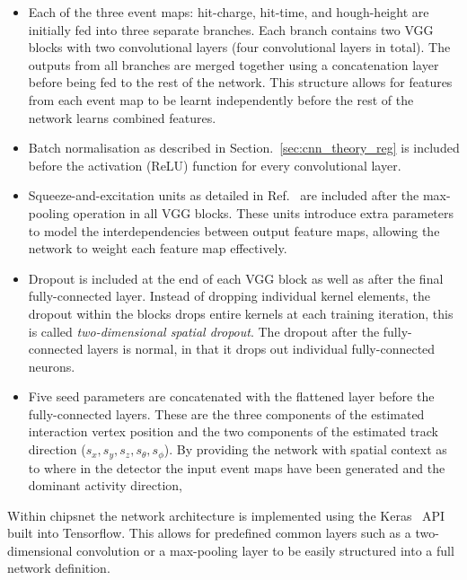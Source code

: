\begin{itemize}
    \item Each of the three event maps: hit-charge, hit-time, and hough-height are initially fed
          into three separate branches. Each branch contains two VGG blocks with two convolutional
          layers (four convolutional layers in total). The outputs from all branches are merged
          together using a concatenation layer before being fed to the rest of the network. This
          structure allows for features from each event map to be learnt independently before the
          rest of the network learns combined features.

    \item Batch normalisation as described in Section.~\ref{sec:cnn_theory_reg} is included before
          the activation (ReLU) function for every convolutional layer.

    \item Squeeze-and-excitation units as detailed in Ref.~\cite{hu2018} are included after the
          max-pooling operation in all VGG blocks. These units introduce extra parameters to model
          the interdependencies between output feature maps, allowing the network to weight each
          feature map effectively.

    \item Dropout is included at the end of each VGG block as well as after the final
          fully-connected layer. Instead of dropping individual kernel elements, the dropout
          within the blocks drops entire kernels at each training iteration, this is called
          \emph{two-dimensional spatial dropout}. The dropout after the fully-connected layers is
          normal, in that it drops out individual fully-connected neurons.

    \item Five seed parameters are concatenated with the flattened layer before the
          fully-connected layers. These are the three components of the estimated interaction
          vertex position and the two components of the estimated track direction ($s_{x},s_{y},
              s_{z},s_{\theta},s_{\phi}$). By providing the network with spatial context as to where
          in the detector the input event maps have been generated and the dominant activity
          direction,
\end{itemize}

Within chipsnet the network architecture is implemented using the Keras~\cite{chollet2015} API
built into Tensorflow. This allows for predefined common layers such as a two-dimensional
convolution or a max-pooling layer to be easily structured into a full network definition.

